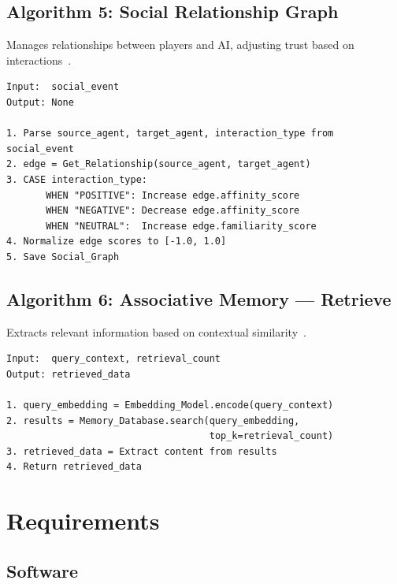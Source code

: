 \subsection{Algorithm 5: Social Relationship Graph}

Manages relationships between players and AI, adjusting trust based on interactions~\cite{yoo2023,poje2023}.

\begin{verbatim}
Input:  social_event
Output: None

1. Parse source_agent, target_agent, interaction_type from social_event
2. edge = Get_Relationship(source_agent, target_agent)
3. CASE interaction_type:
       WHEN "POSITIVE": Increase edge.affinity_score
       WHEN "NEGATIVE": Decrease edge.affinity_score
       WHEN "NEUTRAL":  Increase edge.familiarity_score
4. Normalize edge scores to [-1.0, 1.0]
5. Save Social_Graph
\end{verbatim}

\subsection{Algorithm 6: Associative Memory --- Retrieve}

Extracts relevant information based on contextual similarity~\cite{wangw2024,wangy2024}.

\begin{verbatim}
Input:  query_context, retrieval_count
Output: retrieved_data

1. query_embedding = Embedding_Model.encode(query_context)
2. results = Memory_Database.search(query_embedding,
                                    top_k=retrieval_count)
3. retrieved_data = Extract content from results
4. Return retrieved_data
\end{verbatim}

\section{Requirements}

\subsection{Software}

